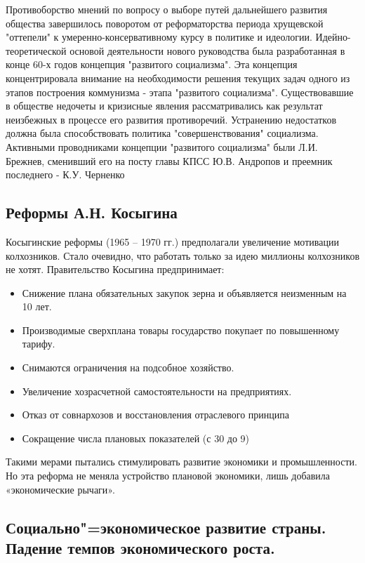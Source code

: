 Противоборство мнений по вопросу о выборе путей дальнейшего развития общества завершилось поворотом от реформаторства периода хрущевской "оттепели" к умеренно-консервативному курсу в политике и идеологии. Идейно-теоретической основой деятельности нового руководства была разработанная в конце 60-х годов концепция "развитого социализма". Эта концепция концентрировала внимание на необходимости решения текущих задач одного из этапов построения коммунизма - этапа "развитого социализма". Существовавшие в обществе недочеты и кризисные явления рассматривались как результат неизбежных в процессе его развития противоречий. Устранению недостатков должна была способствовать политика "совершенствования" социализма. Активными проводниками концепции "развитого социализма" были Л.И. Брежнев, сменивший его на посту главы КПСС Ю.В. Андропов и преемник последнего - К.У. Черненко

\subsection{Реформы А.Н. Косыгина}

Косыгинские реформы (1965 – 1970 гг.) предполагали увеличение мотивации колхозников. Стало очевидно, что работать только за идею миллионы колхозников не хотят. Правительство Косыгина предпринимает:

\begin{itemize}
    \item Снижение плана обязательных закупок зерна и объявляется неизменным на 10 лет. 
    \item Производимые сверхплана товары государство покупает по повышенному тарифу.
    \item Снимаются ограничения на подсобное хозяйство.
    \item Увеличение хозрасчетной самостоятельности на предприятиях.
    \item Отказ от совнархозов и восстановления отраслевого принципа
    \item Сокращение числа плановых показателей (с 30 до 9)    
\end{itemize}

Такими мерами пытались стимулировать развитие экономики и промышленности. Но эта реформа не меняла устройство плановой экономики, лишь добавила «экономические рычаги». 


\subsection{Социально"=экономическое развитие страны. Падение темпов экономического роста.}


